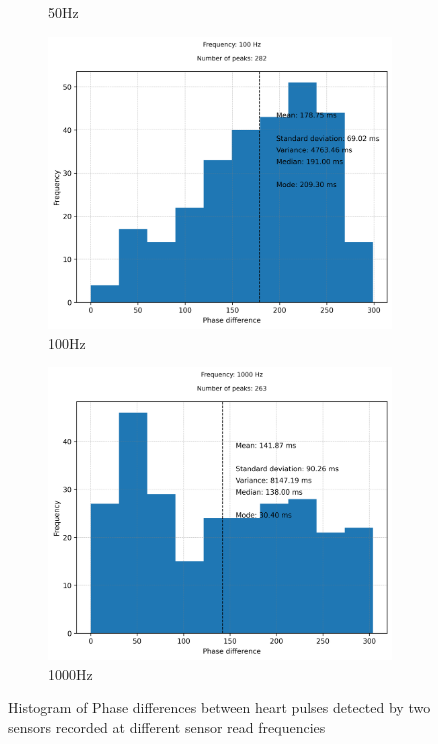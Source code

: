 \begin{figure}[H]
\begin{subfigure}{0.5\linewidth}
        \caption{50Hz}
        \label{fig:histogram_50}
    \end{subfigure}
    \begin{subfigure}{0.5\linewidth}
        \centering
        \includegraphics[width=\linewidth]{chapters/Results/histogram_100.png}
        \caption{100Hz}
        \label{fig:histogram_100}
    \end{subfigure}
    \begin{subfigure}{0.5\linewidth}
        \centering
        \includegraphics[width=\linewidth]{chapters/Results/histogram_1000.png}
        \caption{1000Hz}
        \label{fig:histogram_1000}
    \end{subfigure}
    \caption{\centering Histogram of Phase differences between heart pulses detected by two sensors recorded at different sensor read frequencies}
\end{figure}

